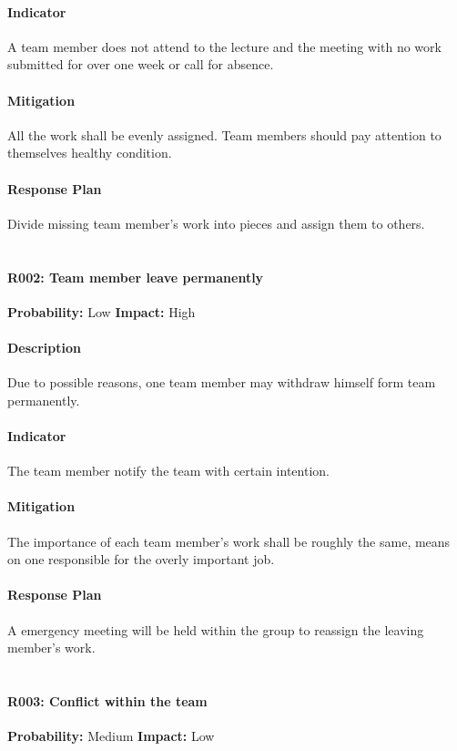 \documentclass[11pt, a4paper]{report}
\begin{document}
	\paragraph{Indicator}A team member does not attend to the lecture and the meeting with no work submitted for over one week or call for absence.
	\paragraph{Mitigation}All the work shall be evenly assigned. Team members should pay attention to themselves healthy condition.\paragraph{Response Plan}Divide missing team member's work into pieces and assign them to others. \\\\


	\paragraph{R002: Team member leave permanently} \hspace{1cm} \textbf{Probability: }Low\hspace{1cm}   \textbf{Impact: }High
	\paragraph{Description}Due to possible reasons, one team member may withdraw himself form team permanently.
	\paragraph{Indicator}The team member notify the team with certain intention.
	\paragraph{Mitigation}The importance of each team member's work shall be roughly the same, means on one responsible for the overly important job. 
	\paragraph{Response Plan}A emergency meeting will be held within the group to reassign the leaving member's work.\\\\


	\paragraph{R003: Conflict within the team} \hspace{1cm} \textbf{Probability: }Medium\hspace{1cm}   \textbf{Impact: }Low
\end{document}
